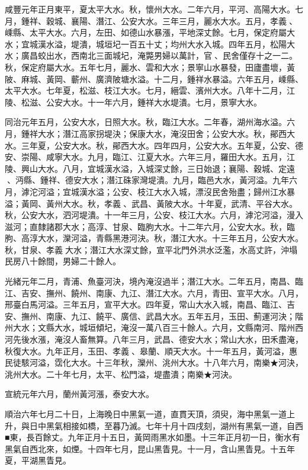 \begin{pinyinscope}
咸豐元年正月東平，夏太平大水。秋，懷州大水。二年六月，平河、高陽大水。七月，鍾祥、穀城、襄陽、潛江、公安大水。三年三月，麗水大水。五月，孝義、嵊縣、太平大水。六月，左田、如德山水暴漲，平地深丈餘。七月，保定府屬大水；宜城漢水溢，堤潰，城垣圮一百五十丈；均州大水入城。四年五月，松陽大水；廣昌蛟出水，西南北三面城圮，淹斃男婦以萬計，官、民舍僅存十之一二。秋，保定府屬大水。五年七月，麗水、雲和大水；景寧山水暴發，田廬盡壞，黃陂、麻城、黃岡、蘄州、廣濟陂塘水溢。十二月，鍾祥水暴溢。六年五月，嵊縣、太平大水。七年夏，松滋、枝江大水。七月，縉雲、濱州大水。八年十二月，江陵、松滋、公安大水。十一年六月，鍾祥大水堤潰。七月，景寧大水。

同治元年五月，公安大水，日照大水。秋，臨江大水。二年春，湖州海水溢。六月，鍾祥大水；潛江高家拐堤決；保康大水，淹沒田舍；公安大水。秋，鄖西大水。三年夏，公安大水。秋，鄖西大水。四年四月，公安大水。五年夏，公安、德安、崇陽、咸寧大水。九月，臨江、江夏大水。六年三月，羅田大水。五月，江陵、興山大水。八月，宜城漢水溢，入城深丈餘，三日始退；襄陽、穀城、定遠、沔縣、鍾祥、德安大水；潛江硃家灣堤潰。九月，臨邑大水，黃河溢。九年六月，滹沱河溢；宜城漢水溢；公安、枝江大水入城，漂沒民舍殆盡；歸州江水暴溢；黃岡、黃州大水。秋，孝義、武昌、黃陂大水。十年夏，武清、平谷大水。秋，公安大水，泗河堤潰。十一年三月，公安、枝江大水。六月，滹沱河溢，漫入滋河；直隸諸郡大水；高淳、甘泉、臨朐大水。十二年六月，公安大水。秋，臨朐、高淳大水，灤河溢，青縣黑港河決。秋，潛江大水。十三年五月，公安大水。秋，甘泉、孝義大水；潛江大水深丈餘，宣平北門外洪水泛濫，水高丈許，沖塌民房八十餘間，男婦二十餘人。

光緒元年二月，青浦、魚臺河決，境內淹沒過半；潛江大水。二年五月，南昌、臨江、吉安、撫州、饒州、南康、九江、潛江大水。六月，青田、宣平大水。八月，邢臺白馬河溢。三年五月，宣平大水。四年夏，常山大水入城，南昌、臨江、吉安、撫州、南康、九江、饒平、廣信、武昌大水。五年五月，玉田、薊運河決；階州大水；文縣大水，城垣傾圮，淹沒一萬八百三十餘人。六月，文縣南河、階州西河先後水漲，淹沒人畜無算。八年三月，武昌、德安大水；常山大水，田禾盡淹，秋復大水。九年正月，玉田、孝義、皋蘭、順天大水。十一年五月，黃河溢，惠民徒駭河溢，霑化大水。十三年秋，灤州、洮州大水。十八年六月，南樂★河決，洮州大水。二十年七月，太平、松門溢，堤盡潰；南樂★河決。

宣統元年六月，蘭州黃河漲，泰安大水。

順治六年七月二十日，上海晚日中黑氣一道，直貫天頂，須臾，海中黑氣一道上升，與日中黑氣相接如橋，至暮乃滅。七年十月十四戌刻，湖州有黑氣一道，自西■東，長百餘丈。九年正月十五日，黃岡雨黑水如墨。十三年正月初一日，衡水有黑氣自西北來，如煙。十四年七月，昆山黑眚見。十一月，含山黑眚見。十五年夏，平湖黑眚見。


\end{pinyinscope}
